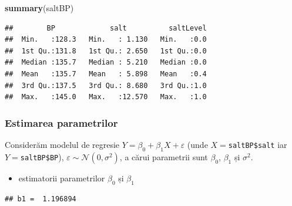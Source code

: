 \documentclass[]{article}
\newenvironment{Shaded}{\begin{snugshade}}{\end{snugshade}}
\newcommand{\KeywordTok}[1]{\textcolor[rgb]{0.13,0.29,0.53}{\textbf{{#1}}}}
\newcommand{\DecValTok}[1]{\textcolor[rgb]{0.00,0.00,0.81}{{#1}}}
\newcommand{\StringTok}[1]{\textcolor[rgb]{0.31,0.60,0.02}{{#1}}}
\newcommand{\CommentTok}[1]{\textcolor[rgb]{0.56,0.35,0.01}{\textit{{#1}}}}
\newcommand{\NormalTok}[1]{{#1}}
\providecommand{\tightlist}{%
  \setlength{\itemsep}{0pt}\setlength{\parskip}{0pt}}
\begin{document}
\begin{Shaded}
\begin{Highlighting}[]
\KeywordTok{summary}\NormalTok{(saltBP)}
\end{Highlighting}
\end{Shaded}

\begin{verbatim}
##        BP             salt          saltLevel  
##  Min.   :128.3   Min.   : 1.130   Min.   :0.0  
##  1st Qu.:131.8   1st Qu.: 2.650   1st Qu.:0.0  
##  Median :135.7   Median : 5.210   Median :0.0  
##  Mean   :135.7   Mean   : 5.898   Mean   :0.4  
##  3rd Qu.:137.5   3rd Qu.: 8.680   3rd Qu.:1.0  
##  Max.   :145.0   Max.   :12.570   Max.   :1.0
\end{verbatim}

\subsubsection{Estimarea parametrilor}\label{estimarea-parametrilor}

Considerăm modelul de regresie \(Y = \beta_0 + \beta_1 X + \varepsilon\)
(unde \(X=\)\texttt{saltBP\$salt} iar \(Y=\)\texttt{saltBP\$BP}),
\(\varepsilon\sim \mathcal{N}(0,\sigma^2)\), a cărui parametrii sunt
\(\beta_0\), \(\beta_1\) și \(\sigma^2\).

\begin{itemize}
\tightlist
\item
  estimatorii parametrilor \(\beta_0\) și \(\beta_1\)
\end{itemize}

\begin{Shaded}
\end{Shaded}

\begin{verbatim}
## b1 =  1.196894
\end{verbatim}

\begin{Shaded}
\end{Shaded}
\end{document}
